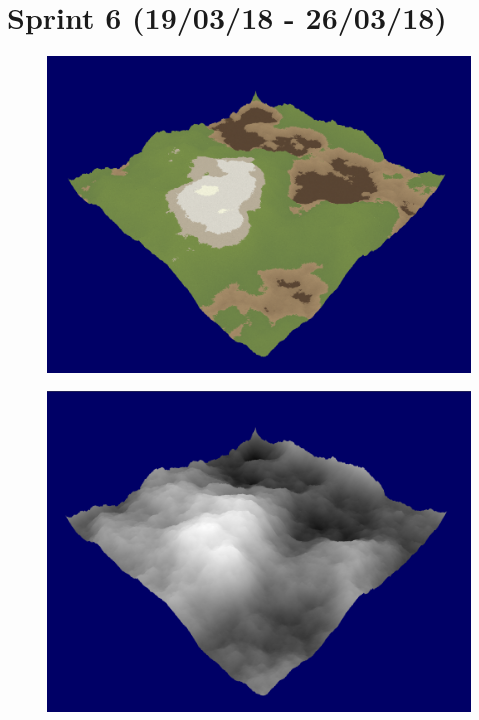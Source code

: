 \documentclass[a4paper,10pt]{report}
\begin{document}
\clearpage

\section{Sprint 6 (19/03/18 - 26/03/18)}


\begin{figure}[h!]
\centering
\begin{minipage}{.5\textwidth}
  \centering
  \includegraphics[width=.9\linewidth]{Images/Sprint-Images/Sprint-7-After-Colour.png}
    \captionsetup{width=.9\linewidth}
  \label{fig:sprint7-c}
\end{minipage}%
\begin{minipage}{.5\textwidth}
  \centering
  \includegraphics[width=.9\linewidth]{Images/Sprint-Images/Sprint-7-After-Greyscale.png}
    \captionsetup{width=.9\linewidth}
  \label{fig:sprint7-g}
\end{minipage}
\end{figure}
\end{document}
